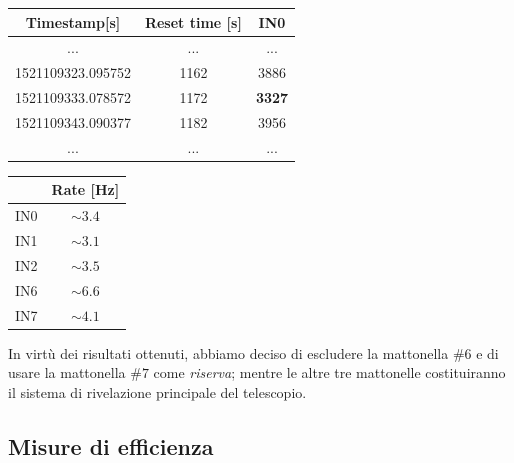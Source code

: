 \documentclass[11pt,a4paper]{article}
\begin{document}
\begin{table}
\begin{subtable}[c]{0.6\textwidth}
\centering
\begin{tabular}{ccc}
    \hline
    Timestamp[s] & Reset time [s] & IN0 \\
    \hline
    \hline
    ... & ... & ...\\
    1521109323.095752 & 1162 & 3886 \\
    1521109333.078572 & 1172 & \textbf{3327} \\
    1521109343.090377 & 1182 & 3956 \\
    ... & ... & ...\\
    \hline
    \end{tabular}
    \label{tab:outlier}
\end{subtable}
\begin{subtable}[c]{0.4\textwidth}
\centering
\begin{tabular}{cc}
    \hline
    & Rate [Hz] \\
    \hline
    \hline
    IN0 & $\sim 3.4$ \\
    IN1 & $\sim 3.1$ \\
    IN2 & $\sim 3.5$ \\
    IN6 & $\sim 6.6$ \\
    IN7 & $\sim 4.1$ \\
    \hline
    \end{tabular}
    \label{tab:rate_20210921}
\end{subtable}
\end{table}
In virtù dei risultati ottenuti, abbiamo deciso di escludere la mattonella $\#6$ e di usare la mattonella $\#7$ come \textit{riserva}; mentre le altre tre mattonelle costituiranno il sistema di rivelazione principale del telescopio.
\subsection{Misure di efficienza}
\end{document}
